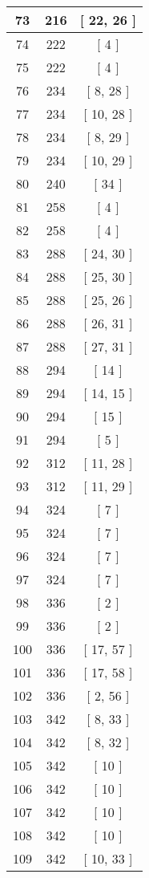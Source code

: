 \begin{center}
\begin{longtable}[H]{|| c c c ||}
\hline
73 & 216 & [ 22, 26 ] \\ 
\hline
74 & 222 & [ 4 ] \\ 
\hline
75 & 222 & [ 4 ] \\ 
\hline
76 & 234 & [ 8, 28 ] \\ 
\hline
77 & 234 & [ 10, 28 ] \\ 
\hline
78 & 234 & [ 8, 29 ] \\ 
\hline
79 & 234 & [ 10, 29 ] \\ 
\hline
80 & 240 & [ 34 ] \\ 
\hline
81 & 258 & [ 4 ] \\ 
\hline
82 & 258 & [ 4 ] \\ 
\hline
83 & 288 & [ 24, 30 ] \\ 
\hline
84 & 288 & [ 25, 30 ] \\ 
\hline
85 & 288 & [ 25, 26 ] \\ 
\hline
86 & 288 & [ 26, 31 ] \\ 
\hline
87 & 288 & [ 27, 31 ] \\ 
\hline
88 & 294 & [ 14 ] \\ 
\hline
89 & 294 & [ 14, 15 ] \\ 
\hline
90 & 294 & [ 15 ] \\ 
\hline
91 & 294 & [ 5 ] \\ 
\hline
92 & 312 & [ 11, 28 ] \\ 
\hline
93 & 312 & [ 11, 29 ] \\ 
\hline
94 & 324 & [ 7 ] \\ 
\hline
95 & 324 & [ 7 ] \\ 
\hline
96 & 324 & [ 7 ] \\ 
\hline
97 & 324 & [ 7 ] \\ 
\hline
98 & 336 & [ 2 ] \\ 
\hline
99 & 336 & [ 2 ] \\ 
\hline
100 & 336 & [ 17, 57 ] \\ 
\hline
101 & 336 & [ 17, 58 ] \\ 
\hline
102 & 336 & [ 2, 56 ] \\ 
\hline
103 & 342 & [ 8, 33 ] \\ 
\hline
104 & 342 & [ 8, 32 ] \\ 
\hline
105 & 342 & [ 10 ] \\ 
\hline
106 & 342 & [ 10 ] \\ 
\hline
107 & 342 & [ 10 ] \\ 
\hline
108 & 342 & [ 10 ] \\ 
\hline
109 & 342 & [ 10, 33 ] \\ 

\end{longtable}
\end{center}
